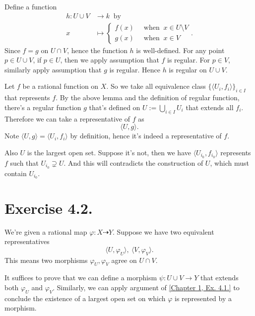 Define a function 
\begin{align*}
    h:U\cup V &\to k ~\text{ by }~\\
     x &\mapsto \begin{cases} f(x) & ~\text{ when }~ x\in U\setminus V\\
                                g(x) & ~\text{ when }~ x\in V
                \end{cases}.
\end{align*} Since $f=g$ on $U\cap V$, hence the function $h$ is well-defined. 
For any point $p\in U\cup V$, if $p\in U$, then we apply assumption that $f$ is regular. For $p\in V$, similarly apply assumption that $g$ is regular.
Hence $h$ is regular on $U\cup V$.

Let $f$ be a rational function on $X$. So we take all equivalence class $\{\langle U_i,f_i\rangle\}_{i\in I}$ that represents $f$.
By the above lemma and the definition of regular function, there's a regular function $g$ that's defined on $U:=\bigcup_{i\in I}U_i$ that extends all $f_i$. 
Therefore we can take a representative of $f$ as 
\[ \langle U,g\rangle.\] Note $\langle U,g\rangle=\langle U_i,f_i\rangle$ by definition, hence it's indeed a representative of $f$. 

Also $U$ is the largest open set. Suppose it's not, then we have $\langle U_{i_0},f_{i_0}\rangle$ represents $f$ such that $U_{i_0}\supsetneq U$. And this will contradicts the construction of $U$, which must contain $U_{i_0}$.

\section{Exercise 4.2.}

We're given a rational map $\varphi:X\dashrightarrow Y$. Suppose we have two equivalent representatives
\[ \langle U,\varphi_U\rangle,~\langle V,\varphi_V\rangle.\] This means two morphisms $\varphi_U,\varphi_V$ agree on $U\cap V$.

It suffices to prove that we can define a morphism $\psi:U\cup V\to Y$ that extends both $\varphi_U$ and $\varphi_V$. 
Similarly, we can apply argument of \ref{Chapter 1, Ex. 4.1.} to conclude the existence of a largest open set on which $\varphi$ is represented by a morphism.

